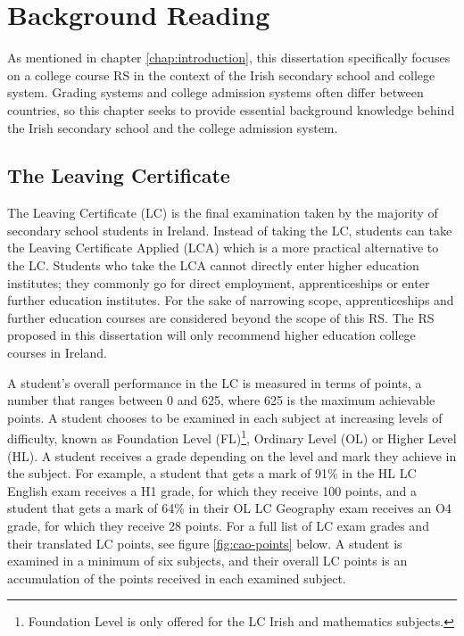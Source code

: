 \chapter{Background Reading}
\label{chap:background-reading}

As mentioned in chapter \ref{chap:introduction}, this dissertation specifically focuses on a college course RS
in the context of the Irish secondary school and college system.
Grading systems and college admission systems often differ between countries, so
this chapter seeks to provide essential background knowledge behind the Irish secondary school
and the college admission system.

\section{The Leaving Certificate}
\label{sec:lc}

The Leaving Certificate (LC) is the final examination taken by the majority of secondary school students in Ireland.
Instead of taking the LC, students can take the Leaving Certificate Applied (LCA) which is a more practical alternative to the LC.
Students who take the LCA cannot directly enter higher education institutes;
they commonly go for direct employment, apprenticeships or enter further education institutes.
For the sake of narrowing scope, apprenticeships and further education courses are considered beyond the scope of this RS.
The RS proposed in this dissertation will only recommend higher education college courses in Ireland.

A student's overall performance in the LC is measured in terms of points, a number that ranges between 0 and 625, where 625 is the maximum achievable points.
A student chooses to be examined in each subject at increasing levels of difficulty, known as Foundation Level (FL)\footnote{Foundation Level is only offered for the LC Irish and mathematics subjects.}, Ordinary Level (OL) or Higher Level (HL).
A student receives a grade depending on the level and mark they achieve in the subject.
For example, a student that gets a mark of 91\% in the HL LC English exam receives a H1 grade, for which they receive 100 points,
and a student that gets a mark of 64\% in their OL LC Geography exam receives an O4 grade, for which they receive 28 points. 
For a full list of LC exam grades and their translated LC points, see figure \ref{fig:cao-points} below.
A student is examined in a minimum of six subjects, and their overall LC points is an accumulation of the points received in each examined subject.

